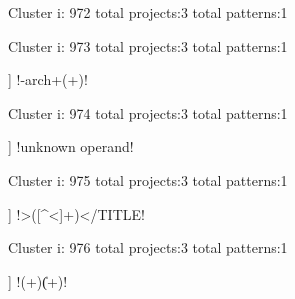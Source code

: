 Cluster i: 972
total projects:3
total patterns:1
\begin{multicols}{1}
\begin{description}[noitemsep,topsep=0pt]
\item [[3] ] \cverb!\(([^()]+)\)$!
\end{description}
\end{multicols}







Cluster i: 973
total projects:3
total patterns:1
\begin{multicols}{1}
\begin{description}[noitemsep,topsep=0pt]
\item [[3] ] \cverb!-arch\s+(\w+)!
\end{description}
\end{multicols}







Cluster i: 974
total projects:3
total patterns:1
\begin{multicols}{1}
\begin{description}[noitemsep,topsep=0pt]
\item [[3] ] \cverb!unknown operand!
\end{description}
\end{multicols}







Cluster i: 975
total projects:3
total patterns:1
\begin{multicols}{1}
\begin{description}[noitemsep,topsep=0pt]
\item [[3] ] \cverb!>([^<]+)</TITLE!
\end{description}
\end{multicols}







Cluster i: 976
total projects:3
total patterns:1
\begin{multicols}{1}
\begin{description}[noitemsep,topsep=0pt]
\item [[3] ] \cverb!(\w+)\|(\w+)!
\end{description}
\end{multicols}







